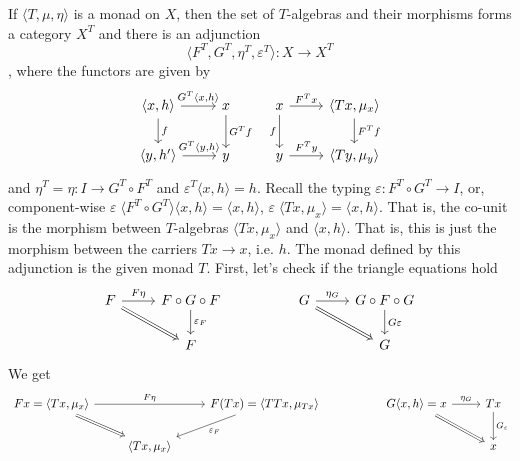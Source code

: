 \documentclass[acmsmall,screen, nonacm, anonymous]{acmart}
\begin{document}
\begin{theorem}
If $\langle T, \mu, \eta \rangle$ is a monad on $X$, then the set of $T$-algebras and their morphisms forms a category $X^T$ and there is an adjunction
\[
\langle F^T, G^T, \eta^{T}, \varepsilon^{T} \rangle : X \to X^{T}
\], where the functors are given by
\[
    \begin{tikzcd}
        {\langle x, h \rangle} \arrow[r, "{G^{T}\langle x, h \rangle}"] \arrow[d, "f"] & x \arrow[d, "G^{T}f"] & x \arrow[r, "F^{T}x"] \arrow[d, "f"'] & {\langle Tx, \mu_{x} \rangle} \arrow[d, "F^{T}f"] \\
        {\langle y, h' \rangle} \arrow[r, "{G^{T}\langle y, h \rangle}"]               & y                     & y \arrow[r, "F^{T}y"]                 & {\langle Ty, \mu_{y} \rangle}                   
    \end{tikzcd}
\]
and $\eta^{T} = \eta : I \to G^{T} \circ F^{T}$ and $\varepsilon^{T}\langle x, h \rangle = h$.
Recall the typing $\varepsilon : F^{T} \circ G^{T} \to I$, or, component-wise $\varepsilon \;\langle F^T \circ G^T \rangle \langle x,h \rangle = \langle x,h \rangle$, $\varepsilon \;\langle Tx, \mu_{x}\rangle = \langle x,h \rangle$.
That is, the co-unit is the morphism between $T$-algebras $\langle Tx, \mu_{x} \rangle$ and $\langle x, h \rangle$.
That is, this is just the morphism between the carriers $Tx \to x$, i.e. $h$.
The monad defined by this adjunction is the given monad $T$.
First, let's check if the triangle equations hold
\[
    \begin{tikzcd}
        F \arrow[r, "F\eta"] \arrow[rd, no head, Rightarrow] & F \circ G \circ F \arrow[d, "\varepsilon_{F}"] &  & G \arrow[r, "\eta_{G}"] \arrow[rd, no head, Rightarrow] & G \circ F \circ G \arrow[d, "G\varepsilon"] \\
                                                             & F                                              &  &                                                         & G                                          
    \end{tikzcd}
\]
We get
\[
\begin{tikzcd}
        {Fx = \langle Tx, \mu_{x} \rangle} \arrow[rr, "F\eta"] \arrow[rd, no head, Rightarrow] &                               & {F(Tx) = \langle TTx, \mu_{Tx} \rangle} \arrow[ld, "\varepsilon_{F}"] &  & {G\langle x, h \rangle = x} \arrow[r, "\eta_{G}"] \arrow[rd, no head, Rightarrow] & Tx \arrow[d, "G_{\varepsilon}"] \\
                                                                                               & {\langle Tx, \mu_{x} \rangle} &                                                                       &  &                                                                                   & x                              

\end{tikzcd}\]
\end{theorem}
\end{document}

